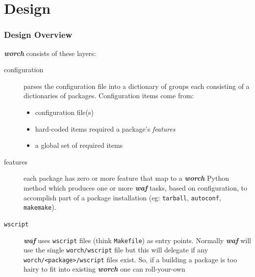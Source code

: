\documentclass[xcolor=dvipsnames]{beamer}
\newcommand{\app}[1]{\textbf{\textit{#1}}\xspace}
\def\waf{\app{waf}}
\def\worch{\app{worch}}
\begin{document}
\section{Design}

\begin{frame}[fragile]
  \frametitle{Design Overview}
  \worch consists of these layers:
  \begin{description}
  \item[configuration] parses the configuration file into a dictionary
    of groups each consisting of a dictionaries of packages.
    Configuration items come from:
    \begin{itemize}
    \item configuration file(s) 
    \item hard-coded items required a package's \textit{features}
    \item a global set of required items
    \end{itemize}
  \item[features] each package has zero or more feature that map to a
    \worch Python method which produces one or more \waf tasks, based
    on configuration, to accomplish part of a package installation
    (eg: \texttt{tarball}, \texttt{autoconf}, \texttt{makemake}).
  \item[\texttt{wscript}] \waf uses \texttt{wscript} files (think
    \texttt{Makefile}) as entry points.  Normally \waf will use the
    single \texttt{worch/wscript} file but this will delegate if any
    \verb|worch/<package>/wscript| files exist.  So, if a building a
    package is too hairy to fit into existing \worch one can
    roll-your-own
  \end{description}
\end{frame}
\end{document}
